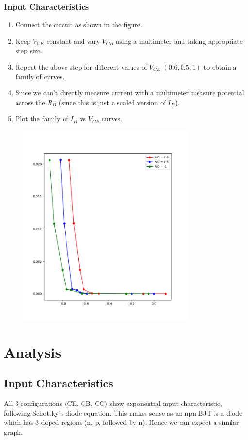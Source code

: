\documentclass[12pt,a4paper]{article}
\begin{document}
\subsubsection{Input Characteristics}
\begin{enumerate}
    \item Connect the circuit as shown in the figure. 
    \item Keep $V_{CE}$ constant and vary $V_{CB}$ using a multimeter and taking appropriate step size.
    \item Repeat the above step for different values of $V_{CE}$ $(0.6, 0.5, 1)$ to obtain a family of curves.
    \item Since we can't directly measure current with a multimeter measure potential across the $R_B$ (since this is just a scaled version of $I_B$).
    \item Plot the family of $I_B$ vs $V_{CB}$ curves.
\end{enumerate}
\begin{figure}[H]
    \centering
    \includegraphics[width=0.8\textwidth]{Experiment_6/figs/cc_ip.png}
\end{figure}                


\section{Analysis}
\subsection{Input Characteristics}
All 3 configurations (CE, CB, CC) show exponential input characteristic, following Schottky's diode equation. This makes sense as an npn BJT is a diode which has 3 doped regions (n, p, followed by n). Hence we can expect a similar graph. 
\end{document}
